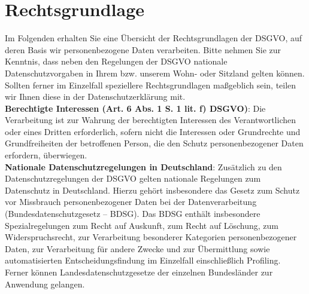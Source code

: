 \documentclass[12pt]{article}
\begin{document}
\part{Rechtsgrundlage}
Im Folgenden erhalten Sie eine Übersicht der Rechtsgrundlagen der DSGVO, auf deren Basis wir personenbezogene Daten verarbeiten. Bitte nehmen Sie zur Kenntnis, dass neben den Regelungen der DSGVO nationale Datenschutzvorgaben in Ihrem bzw. unserem Wohn- oder Sitzland gelten können. Sollten ferner im Einzelfall speziellere Rechtsgrundlagen maßgeblich sein, teilen wir Ihnen diese in der Datenschutzerklärung mit.\\
\textbf{Berechtigte Interessen (Art. 6 Abs. 1 S. 1 lit. f) DSGVO)}: Die Verarbeitung ist zur Wahrung der berechtigten Interessen des Verantwortlichen oder eines Dritten erforderlich, sofern nicht die Interessen oder Grundrechte und Grundfreiheiten der betroffenen Person, die den Schutz personenbezogener Daten erfordern, überwiegen.\\
\textbf{Nationale Datenschutzregelungen in Deutschland}: Zusätzlich zu den Datenschutzregelungen der DSGVO gelten nationale Regelungen zum Datenschutz in Deutschland. Hierzu gehört insbesondere das Gesetz zum Schutz vor Missbrauch personenbezogener Daten bei der Datenverarbeitung (Bundesdatenschutzgesetz – BDSG). Das BDSG enthält insbesondere Spezialregelungen zum Recht auf Auskunft, zum Recht auf Löschung, zum Widerspruchsrecht, zur Verarbeitung besonderer Kategorien personenbezogener Daten, zur Verarbeitung für andere Zwecke und zur Übermittlung sowie automatisierten Entscheidungsfindung im Einzelfall einschließlich Profiling. Ferner können Landesdatenschutzgesetze der einzelnen Bundesländer zur Anwendung gelangen.
\end{document}
